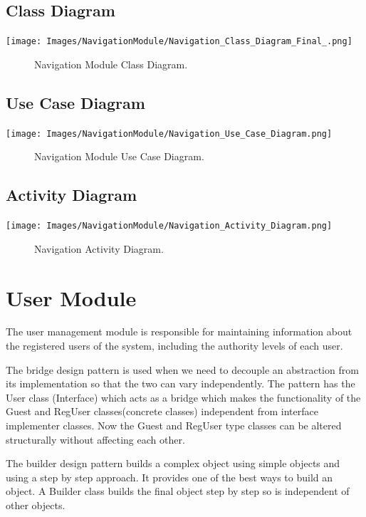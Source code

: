 \documentclass[a4paper, 12pt, one column]{article}
\begin{document}
\begin{center}
\subsection{Class Diagram}
        \texttt{[image: Images/NavigationModule/Navigation\_Class\_Diagram\_Final\_.png]}
        \begin{figure}[h]
            \caption{Navigation Module Class Diagram.}
        \end{figure}
        
\subsection{Use Case Diagram}
        \texttt{[image: Images/NavigationModule/Navigation\_Use\_Case\_Diagram.png]}
        \begin{figure}[h]
            \caption{Navigation Module Use Case Diagram.}
        \end{figure}
        
\subsection{Activity Diagram}
        \texttt{[image: Images/NavigationModule/Navigation\_Activity\_Diagram.png]}
        \begin{figure}[h]
            \caption{Navigation Activity Diagram.}
        \end{figure}
        
\end{center}
        
\section{User Module}

The user management module is responsible for maintaining information about the registered users of the system, including the authority levels of each user.

The bridge design pattern is used when we need to decouple an abstraction from its implementation so that the two can vary independently. The pattern has the User class (Interface) which acts as a bridge which makes the functionality of the Guest and RegUser classes(concrete classes) independent from interface implementer classes. Now the Guest and RegUser type classes can be altered structurally without affecting each other.

The builder design pattern builds a complex object using simple objects and using a step by step approach. It provides one of the best ways to build an object. A Builder class builds the final object step by step so is independent of other objects. 
\end{document}
